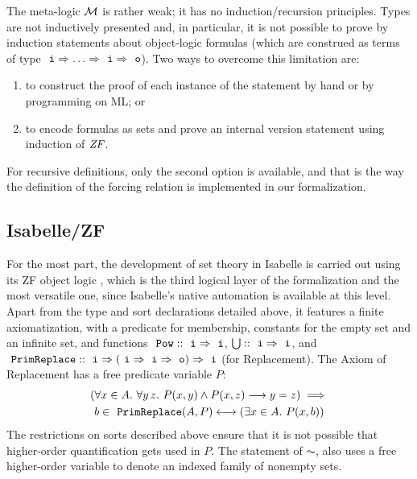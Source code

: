 The meta-logic $\mathcal{M}$ is rather weak; it has no induction/recursion
principles. Types are not inductively presented and, in particular, it
is not possible to prove by induction statements about
object-logic formulas (which are construed as terms of type $\tyi \fun
\dots \fun \tyi \fun \tyo$). Two ways to overcome this limitation are:
\begin{enumerate}
\item
  to construct the
  proof of each instance of the statement by hand or by programming on
  ML; or 
\item
  to encode formulas as sets and prove an internal version statement
  using induction of $\mathit{ZF}$.
\end{enumerate}

For recursive definitions, only the second option is available, and
that is the way the definition of the forcing relation is implemented
in our formalization.

\subsection{Isabelle/ZF}
\label{sec:isabellezf}

For the most part, the development of set theory in Isabelle is
carried out using its ZF object logic
\cite{DBLP:journals/jar/PaulsonG96}, which is the third logical layer
of the formalization and the most versatile one, since 
Isabelle's native automation is available at this level. Apart from
the type and sort
declarations detailed above, it features a finite axiomatization,
with a predicate for membership, constants for the empty set and an
infinite set, and functions $\isatt{Pow}::\tyi\fun\tyi$,
$\union::\tyi\fun\tyi$, and $\isatt{PrimReplace} :: \tyi \fun (\tyi
\fun \tyi \fun\tyo)\fun \tyi$ (for Replacement). The Axiom of
Replacement
has a free predicate variable $P$: %
\begin{multline*}
  (\forall x \in A .\ \forall y\, z.\ P(x, y) \wedge P(x, z)
  \longrightarrow y=z) \implies \\
  b \in \isatt{PrimReplace}(A, P)
  \longleftrightarrow(\exists x \in A .\ P(x, b)) 
\end{multline*}
The restrictions on sorts described above ensure that it is not
possible that higher-order quantification gets used in $P$. The
statement of $\AC$, also uses a free higher-order variable to denote
an indexed family of nonempty sets. %

